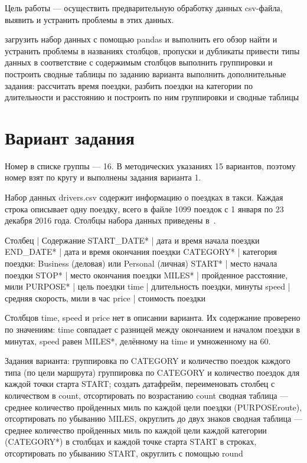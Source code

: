 \documentclass[a4paper,14pt]{extarticle}
\begin{document}
\maketitle
\suaitoc

\suaiintro

Цель работы — осуществить предварительную обработку данных csv-файла, выявить и устранить проблемы в этих данных.

\suaitasks
загрузить набор данных с помощью pandas и выполнить его обзор
найти и устранить проблемы в названиях столбцов, пропуски и дубликаты
привести типы данных в соответствие с содержимым столбцов
выполнить группировки и построить сводные таблицы по заданию варианта
выполнить дополнительные задания: рассчитать время поездки, разбить поездки на категории по длительности и расстоянию и построить по ним группировки и сводные таблицы

\section{Вариант задания}

Номер в списке группы — 16. В методических указаниях 15 вариантов, поэтому номер взят по кругу и выполнены задания варианта 1.

Набор данных drivers.csv содержит информацию о поездках в такси. Каждая строка описывает одну поездку, всего в файле 1099 поездок с 1 января по 23 декабря 2016 года. Столбцы набора данных приведены в~.

Столбец | Содержание
START\_DATE* | дата и время начала поездки
END\_DATE* | дата и время окончания поездки
CATEGORY* | категория поездки: Business (деловая) или Personal (личная)
START* | место начала поездки
STOP* | место окончания поездки
MILES* | пройденное расстояние, мили
PURPOSE* | цель поездки
time | длительность поездки, минуты
speed | средняя скорость, мили в час
price | стоимость поездки

Столбцов time, speed и price нет в описании варианта. Их содержание проверено по значениям: time совпадает с разницей между окончанием и началом поездки в минутах, speed равен MILES*, делённому на time и умноженному на 60.

Задания варианта:
\suainum
группировка по CATEGORY и количество поездок каждого типа (по цели маршрута)
группировка по CATEGORY и количество поездок для каждой точки старта START; создать датафрейм, переименовать столбец с количеством в count, отсортировать по возрастанию count
сводная таблица — среднее количество пройденных миль по каждой цели поездки (PURPOSEroute), отсортировать по убыванию MILES, округлить до двух знаков
сводная таблица — среднее количество пройденных миль по каждой цели каждой категории (CATEGORY*) в столбцах и каждой точке старта START в строках, отсортировать по убыванию START, округлить с помощью round
\end{document}
